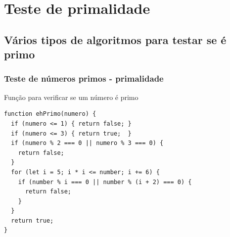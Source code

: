 \documentclass[13pt, xcolor={dvipsnames,svgnames}, portuguese]{beamer}
\begin{document}
\section{Teste de primalidade}
\subsection{Vários tipos de algoritmos para testar se é primo}
\begin{frame}[fragile]
\frametitle{Teste de números primos - primalidade}
Função para verificar se um número é primo
\begin{verbatim}
function ehPrimo(numero) {
  if (numero <= 1) { return false; }
  if (numero <= 3) { return true;  }
  if (numero % 2 === 0 || numero % 3 === 0) {
    return false;
  }
  for (let i = 5; i * i <= number; i += 6) {
    if (number % i === 0 || number % (i + 2) === 0) {
      return false;
    }
  }
  return true;
}
\end{verbatim}
\end{frame}








\end{document}
